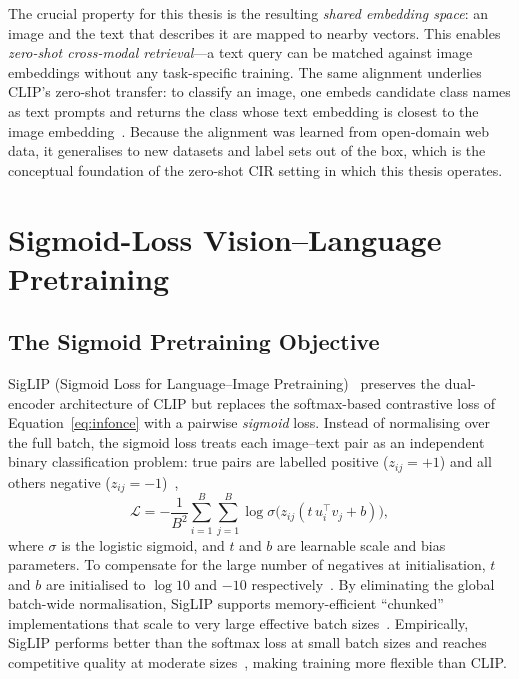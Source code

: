 The crucial property for this thesis is the resulting \emph{shared embedding
space}: an image and the text that describes it are mapped to nearby vectors.
This enables \emph{zero-shot cross-modal retrieval}---a text query can be matched
against image embeddings without any task-specific training. The same alignment
underlies CLIP's zero-shot transfer: to classify an image, one embeds candidate
class names as text prompts and returns the class whose text embedding is closest
to the image embedding~\cite{radford2021clip}. Because the alignment was learned
from open-domain web data, it generalises to new datasets and label sets out of
the box, which is the conceptual foundation of the zero-shot CIR setting in which
this thesis operates.


\section{Sigmoid-Loss Vision--Language Pretraining}\label{sect:bg_siglip}

\subsection{The Sigmoid Pretraining Objective}

SigLIP (Sigmoid Loss for Language--Image
Pretraining)~\cite{zhai2023siglip} preserves the dual-encoder architecture of
CLIP but replaces the softmax-based contrastive loss of
Equation~\eqref{eq:infonce} with a pairwise \emph{sigmoid} loss. Instead of
normalising over the full batch, the sigmoid loss treats each image--text pair as
an independent binary classification problem: true pairs are labelled positive
($z_{ij}=+1$) and all others negative ($z_{ij}=-1$)~\cite{zhai2023siglip},
\begin{equation}\label{eq:siglip}
  \mathcal{L}
  = -\frac{1}{B^{2}}\sum_{i=1}^{B}\sum_{j=1}^{B}
    \log\sigma\!\bigl(z_{ij}(t\,u_{i}^{\top}v_{j}+b)\bigr),
\end{equation}
where $\sigma$ is the logistic sigmoid, and $t$ and $b$ are learnable scale and
bias parameters. To compensate for the large number of negatives at
initialisation, $t$ and $b$ are initialised to $\log 10$ and $-10$
respectively~\cite{zhai2023siglip}. By eliminating the global batch-wide
normalisation, SigLIP supports memory-efficient ``chunked'' implementations that
scale to very large effective batch sizes~\cite{zhai2023siglip}. Empirically,
SigLIP performs better than the softmax loss at small batch sizes and reaches
competitive quality at moderate sizes~\cite{zhai2023siglip}, making training
more flexible than CLIP.

